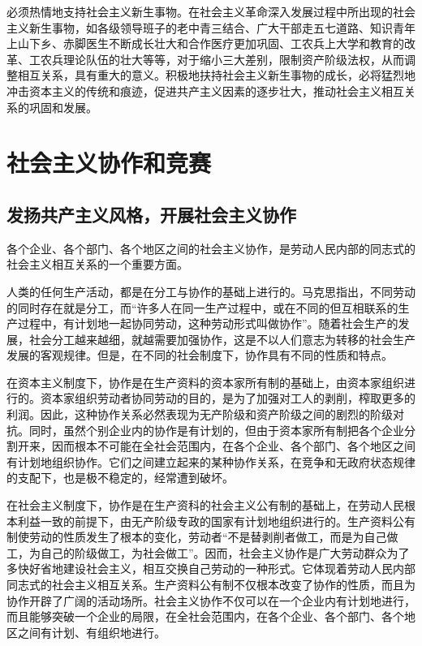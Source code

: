 \documentclass{book}
\begin{document}
必须热情地支持社会主义新生事物。在社会主义革命深入发展过程中所出现的社会主义新生事物，如各级领导班子的老中青三结合、广大干部走五七道路、知识青年上山下乡、赤脚医生不断成长壮大和合作医疗更加巩固、工农兵上大学和教育的改革、工农兵理论队伍的壮大等等，对于缩小三大差别，限制资产阶级法权，从而调整相互关系，具有重大的意义。积极地扶持社会主义新生事物的成长，必将猛烈地冲击资本主义的传统和痕迹，促进共产主义因素的逐步壮大，推动社会主义相互关系的巩固和发展。

\section{社会主义协作和竞赛}

\subsection{发扬共产主义风格，开展社会主义协作}

各个企业、各个部门、各个地区之间的社会主义协作，是劳动人民内部的同志式的社会主义相互关系的一个重要方面。

人类的任何生产活动，都是在分工与协作的基础上进行的。马克思指出，不同劳动的同时存在就是分工，而“许多人在同一生产过程中，或在不同的但互相联系的生产过程中，有计划地一起协同劳动，这种劳动形式叫做协作”。随着社会生产的发展，社会分工越来越细，就越需要加强协作，这是不以人们意志为转移的社会生产发展的客观规律。但是，在不同的社会制度下，协作具有不同的性质和特点。

在资本主义制度下，协作是在生产资料的资本家所有制的基础上，由资本家组织进行的。资本家组织劳动者协同劳动的目的，是为了加强对工人的剥削，榨取更多的利润。因此，这种协作关系必然表现为无产阶级和资产阶级之间的剧烈的阶级对抗。同时，虽然个别企业内的协作是有计划的，但由于资本家所有制把各个企业分割开来，因而根本不可能在全社会范围内，在各个企业、各个部门、各个地区之间有计划地组织协作。它们之间建立起来的某种协作关系，在竞争和无政府状态规律的支配下，也是极不稳定的，经常遭到破坏。

在社会主义制度下，协作是在生产资科的社会主义公有制的基础上，在劳动人民根本利益一致的前提下，由无产阶级专政的国家有计划地组织进行的。生产资料公有制使劳动的性质发生了根本的变化，劳动者“不是替剥削者做工，而是为自己做工，为自己的阶级做工，为社会做工”。因而，社会主义协作是广大劳动群众为了多快好省地建设社会主义，相互交换自己劳动的一种形式。它体现着劳动人民内部同志式的社会主义相互关系。生产资料公有制不仅根本改变了协作的性质，而且为协作开辟了广阔的活动场所。社会主义协作不仅可以在一个企业内有计划地进行，而且能够突破一个企业的局限，在全社会范围内，在各个企业、各个部门、各个地区之间有计划、有组织地进行。
\end{document}
